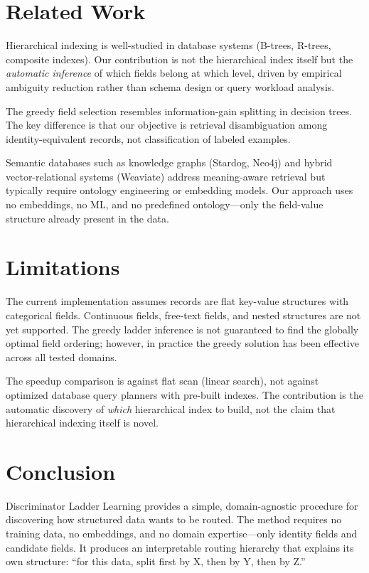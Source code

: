 \documentclass[11pt]{article}
\begin{document}
\section{Related Work}

Hierarchical indexing is well-studied in database systems (B-trees, R-trees, composite indexes). Our contribution is not the hierarchical index itself but the \textit{automatic inference} of which fields belong at which level, driven by empirical ambiguity reduction rather than schema design or query workload analysis.

The greedy field selection resembles information-gain splitting in decision trees. The key difference is that our objective is retrieval disambiguation among identity-equivalent records, not classification of labeled examples.

Semantic databases such as knowledge graphs (Stardog, Neo4j) and hybrid vector-relational systems (Weaviate) address meaning-aware retrieval but typically require ontology engineering or embedding models. Our approach uses no embeddings, no ML, and no predefined ontology---only the field-value structure already present in the data.

\section{Limitations}

The current implementation assumes records are flat key-value structures with categorical fields. Continuous fields, free-text fields, and nested structures are not yet supported. The greedy ladder inference is not guaranteed to find the globally optimal field ordering; however, in practice the greedy solution has been effective across all tested domains.

The speedup comparison is against flat scan (linear search), not against optimized database query planners with pre-built indexes. The contribution is the automatic discovery of \textit{which} hierarchical index to build, not the claim that hierarchical indexing itself is novel.

\section{Conclusion}

Discriminator Ladder Learning provides a simple, domain-agnostic procedure for discovering how structured data wants to be routed. The method requires no training data, no embeddings, and no domain expertise---only identity fields and candidate fields. It produces an interpretable routing hierarchy that explains its own structure: ``for this data, split first by X, then by Y, then by Z.''
\end{document}
